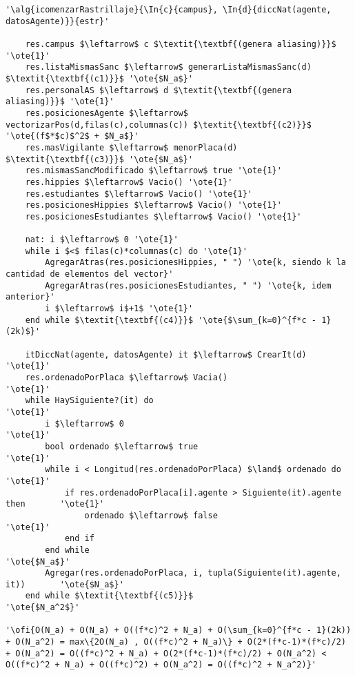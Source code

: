 \begin{lstlisting}[mathescape]
'\alg{icomenzarRastrillaje}{\In{c}{campus}, \In{d}{diccNat(agente, datosAgente)}}{estr}'

	res.campus $\leftarrow$ c $\textit{\textbf{(genera aliasing)}}$ '\ote{1}'
	res.listaMismasSanc $\leftarrow$ generarListaMismasSanc(d) $\textit{\textbf{(c1)}}$ '\ote{$N_a$}'
	res.personalAS $\leftarrow$ d $\textit{\textbf{(genera aliasing)}}$ '\ote{1}'
	res.posicionesAgente $\leftarrow$ vectorizarPos(d,filas(c),columnas(c)) $\textit{\textbf{(c2)}}$ '\ote{(f$*$c)$^2$ + $N_a$}'
	res.masVigilante $\leftarrow$ menorPlaca(d) $\textit{\textbf{(c3)}}$ '\ote{$N_a$}'
	res.mismasSancModificado $\leftarrow$ true '\ote{1}'
	res.hippies $\leftarrow$ Vacio() '\ote{1}'
	res.estudiantes $\leftarrow$ Vacio() '\ote{1}'
	res.posicionesHippies $\leftarrow$ Vacio() '\ote{1}'
	res.posicionesEstudiantes $\leftarrow$ Vacio() '\ote{1}'

	nat: i $\leftarrow$ 0 '\ote{1}'
	while i $<$ filas(c)*columnas(c) do '\ote{1}'
		AgregarAtras(res.posicionesHippies, " ") '\ote{k, siendo k la cantidad de elementos del vector}'
		AgregarAtras(res.posicionesEstudiantes, " ") '\ote{k, idem anterior}'
		i $\leftarrow$ i$+1$ '\ote{1}'
	end while $\textit{\textbf{(c4)}}$ '\ote{$\sum_{k=0}^{f*c - 1}(2k)$}'

	itDiccNat(agente, datosAgente) it $\leftarrow$ CrearIt(d) 					'\ote{1}'
	res.ordenadoPorPlaca $\leftarrow$ Vacia()									'\ote{1}'
	while HaySiguiente?(it) do 													'\ote{1}'
		i $\leftarrow$ 0														'\ote{1}'
		bool ordenado $\leftarrow$ true											'\ote{1}'
		while i < Longitud(res.ordenadoPorPlaca) $\land$ ordenado do			'\ote{1}'
			if res.ordenadoPorPlaca[i].agente > Siguiente(it).agente then		'\ote{1}'
				ordenado $\leftarrow$ false 									'\ote{1}'
			end if
		end while																'\ote{$N_a$}'
		Agregar(res.ordenadoPorPlaca, i, tupla(Siguiente(it).agente, it)) 		'\ote{$N_a$}'
	end while $\textit{\textbf{(c5)}}$											'\ote{$N_a^2$}'

'\ofi{O(N_a) + O(N_a) + O((f*c)^2 + N_a) + O(\sum_{k=0}^{f*c - 1}(2k)) + O(N_a^2) = max\{2O(N_a) , O((f*c)^2 + N_a)\} + O(2*(f*c-1)*(f*c)/2) + O(N_a^2) = O((f*c)^2 + N_a) + O(2*(f*c-1)*(f*c)/2) + O(N_a^2) < O((f*c)^2 + N_a) + O((f*c)^2) + O(N_a^2) = O((f*c)^2 + N_a^2)}'
\end{lstlisting}

